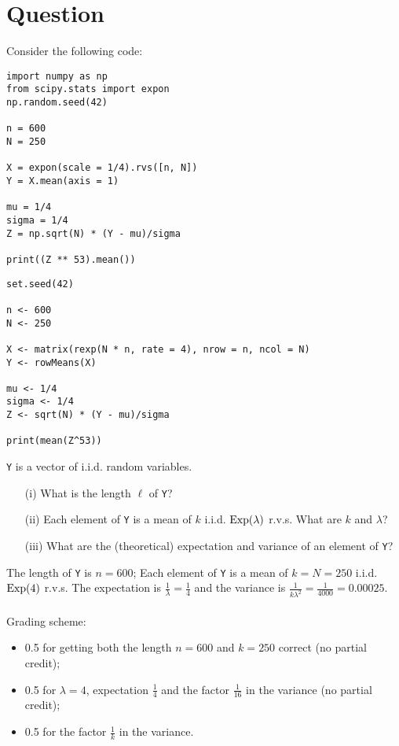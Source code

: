 \section{Question}

Consider the following code:

\begin{verbatim}
import numpy as np
from scipy.stats import expon
np.random.seed(42)

n = 600
N = 250

X = expon(scale = 1/4).rvs([n, N])
Y = X.mean(axis = 1)

mu = 1/4
sigma = 1/4
Z = np.sqrt(N) * (Y - mu)/sigma

print((Z ** 53).mean())
\end{verbatim}

\begin{verbatim}
set.seed(42)

n <- 600
N <- 250

X <- matrix(rexp(N * n, rate = 4), nrow = n, ncol = N)
Y <- rowMeans(X)

mu <- 1/4
sigma <- 1/4
Z <- sqrt(N) * (Y - mu)/sigma

print(mean(Z^53))
\end{verbatim}

\vspace*{20pt}


\begin{exercise}[1.5]
\texttt{Y} is a vector of i.i.d. random variables.

\begin{itemize}
\item[(i)] What is the length $\ell$ of \texttt{Y}?
\item[(ii)] Each element of \texttt{Y} is a mean of $k$ i.i.d. $\mathrm{Exp}(\lambda)$ r.v.s.
What are $k$ and $\lambda$?  
\item[(iii)] What are the (theoretical) expectation and variance of an element of \texttt{Y}? 
\end{itemize} 

\begin{solution}
The length of \texttt{Y} is $n = 600$;  Each element of \texttt{Y} is a mean of $k = N = 250$ i.i.d. $\mathrm{Exp}(4)$ r.v.s.
The expectation is $\frac1\lambda = \frac14$ and the variance is $\frac1{k \lambda^2} = \frac1{4000} = 0.00025$. \\ \\
Grading scheme:
\begin{itemize}
\item 0.5 for getting both the length $n=600$ and  $k=250$ correct (no partial credit);
\item 0.5 for $\lambda = 4$, expectation $\frac14$ and the factor $\frac1{16}$ in the variance (no partial credit);
\item 0.5 for the factor $\frac1{k}$ in the variance.
\end{itemize}
\end{solution}
\end{exercise}

